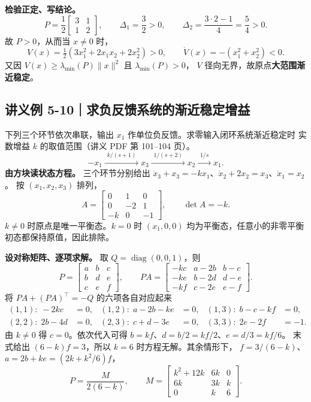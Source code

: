 \documentclass[UTF8,a4paper,11pt,fontset=fandol]{ctexart}
\begin{document}
\textbf{检验正定、写结论。}
\[
   P=\frac12\begin{bmatrix}3&1\\1&2\end{bmatrix},
   \qquad \Delta_1=\frac32>0,\qquad
   \Delta_2=\frac{3\cdot2-1}{4}=\frac54>0 .
\]
故 $P>0$，从而当 $x\ne 0$ 时，
\[
 V(x)=\tfrac12(3x_1^2+2x_1x_2+2x_2^2)>0,\qquad
 \dot V(x)=-(x_1^2+x_2^2)<0 .
\]
又因 $V(x)\ge\lambda_{\min}(P)\lVert x\rVert^2$ 且 $\lambda_{\min}(P)>0$，
$V$ 径向无界，故原点\textbf{大范围渐近稳定}。

\newpage
\subsection*{讲义例 5-10｜求负反馈系统的渐近稳定增益}\label{prob:gain}
下列三个环节依次串联，输出 $x_1$ 作单位负反馈。求零输入闭环系统渐近稳定时
实数增益 $k$ 的取值范围（讲义 PDF 第 101--104 页）。
\[
  -x_1 \xrightarrow{\ \,k/(s+1)\, \ } x_3
  \xrightarrow{\ \,1/(s+2)\, \ } x_2
  \xrightarrow{\ \,1/s\, \ } x_1 .
\]
\textbf{由方块读状态方程。}
三个环节分别给出 $\dot x_3+x_3=-kx_1$、$\dot x_2+2x_2=x_3$、$\dot x_1=x_2$。
按 $(x_1,x_2,x_3)$ 排列，
\[
   A=\begin{bmatrix}0&1&0\\0&-2&1\\-k&0&-1\end{bmatrix},\qquad
   \det A=-k .
\]
$k\ne0$ 时原点是唯一平衡态。$k=0$ 时 $(x_1,0,0)$ 均为平衡态，任意小的非零平衡初态都保持原值，因此排除。

\textbf{设对称矩阵、逐项求解。} 取 $Q=\operatorname{diag}(0,0,1)$，则
\[
   P=\begin{bmatrix}a&b&c\\b&d&e\\c&e&f\end{bmatrix},\qquad
   PA=\begin{bmatrix}
   -kc&a-2b&b-c\\
   -ke&b-2d&d-e\\
   -kf&c-2e&e-f
   \end{bmatrix}.
\]
将 $PA+(PA)^\top=-Q$ 的六项各自对应起来
\[
 \begin{aligned}
   (1,1):\;-2kc&=0, & (1,2):\; a-2b-ke&=0, & (1,3):\; b-c-kf&=0,\\
   (2,2):\;2b-4d&=0, & (2,3):\;c+d-3e&=0, & (3,3):\;2e-2f&=-1 .
 \end{aligned}
\]
由 $k\ne0$ 得 $c=0$。依次代入可得
$b=kf$、$d=b/2=kf/2$、$e=d/3=kf/6$。
末式给出 $(6-k)f=3$，所以 $k=6$ 时方程无解。其余情形下，
$f=3/(6-k)$、$a=2b+ke=(2k+k^2/6)f$，
\[
  P=\frac{M}{2(6-k)},\qquad
  M=\begin{bmatrix}k^2+12k&6k&0\\6k&3k&k\\0&k&6\end{bmatrix}.
\]
\end{document}
